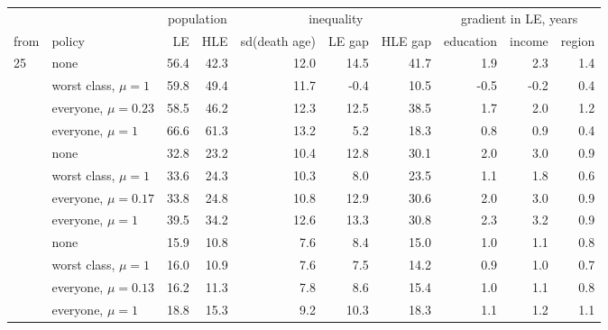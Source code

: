 \begin{tabular}{llrrrrrrrr}
\toprule
 & & \multicolumn{2}{c}{population} & \multicolumn{3}{c}{inequality} & \multicolumn{3}{c}{gradient in LE, years} \\
\cmidrule(lr){3-4} \cmidrule(lr){5-7} \cmidrule(lr){8-10}
from & policy & LE & HLE & sd(death age) & LE gap & HLE gap & education & income & region \\
\midrule
25 & none & 56.4 & 42.3 & 12.0 & 14.5 & 41.7 & 1.9 & 2.3 & 1.4 \\
 & worst class, $\mu=1$ & 59.8 & 49.4 & 11.7 & -0.4 & 10.5 & -0.5 & -0.2 & 0.4 \\
 & everyone, $\mu=0.23$ & 58.5 & 46.2 & 12.3 & 12.5 & 38.5 & 1.7 & 2.0 & 1.2 \\
 & everyone, $\mu=1$ & 66.6 & 61.3 & 13.2 & 5.2 & 18.3 & 0.8 & 0.9 & 0.4 \\
\addlinespace
50 & none & 32.8 & 23.2 & 10.4 & 12.8 & 30.1 & 2.0 & 3.0 & 0.9 \\
 & worst class, $\mu=1$ & 33.6 & 24.3 & 10.3 & 8.0 & 23.5 & 1.1 & 1.8 & 0.6 \\
 & everyone, $\mu=0.17$ & 33.8 & 24.8 & 10.8 & 12.9 & 30.6 & 2.0 & 3.0 & 0.9 \\
 & everyone, $\mu=1$ & 39.5 & 34.2 & 12.6 & 13.3 & 30.8 & 2.3 & 3.2 & 0.9 \\
\addlinespace
70 & none & 15.9 & 10.8 & 7.6 & 8.4 & 15.0 & 1.0 & 1.1 & 0.8 \\
 & worst class, $\mu=1$ & 16.0 & 10.9 & 7.6 & 7.5 & 14.2 & 0.9 & 1.0 & 0.7 \\
 & everyone, $\mu=0.13$ & 16.2 & 11.3 & 7.8 & 8.6 & 15.4 & 1.0 & 1.1 & 0.8 \\
 & everyone, $\mu=1$ & 18.8 & 15.3 & 9.2 & 10.3 & 18.3 & 1.1 & 1.2 & 1.1 \\
\bottomrule
\end{tabular}
